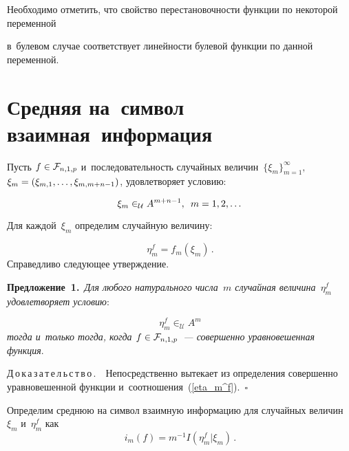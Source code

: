\begin{multicols}{2}
Необходимо отметить, что свойство перестановочности функции по некоторой 
переменной\linebreak\vspace*{-12pt}

\columnbreak

\noindent
 в~булевом случае соответствует линейности булевой функции по данной 
переменной.

\vspace*{-9pt}

\section{Средняя на~символ взаимная~информация}

\vspace*{-2pt}

Пусть $f \hm\in \mathcal{F}_{n,1,p}$ и~последовательность случайных 
величин~$\{\xi_m\}_{m=1}^{\infty},$ $\xi_m\hm=(\xi_{m,1}, \dots, \xi_{m, m+n-1})$, 
удовлетворяет условию:

\noindent
$$
\xi_m \in_{\mathcal{U}} A^{m+n-1},\enskip m = 1,2,\dots
$$

Для каждой~$\xi_m$ определим случайную величину:

\noindent
\begin{equation}
\label{eta_m^f}
\eta _m^f = f_m\left(\xi_m\right)\,.
\end{equation}
Справедливо следующее утверждение.

\smallskip

\noindent
\textbf{Предложение~1.}\
   \textit{Для любого натурального числа~$m$ случайная величина~$\eta_m^f$ 
удовлетворяет условию}:

\noindent
$$
    \eta_m^f \in_{\mathcal{U}} A^m
  $$
    \textit{тогда и~только тогда, когда $f \hm\in \mathcal{F}_{n,1,p}$~--- совершенно 
уравновешенная функция}.

\smallskip

\noindent
Д\,о\,к\,а\,з\,а\,т\,е\,л\,ь\,с\,т\,в\,о\,.\ \
    Непосредственно вытекает из определения совершенно уравновешенной функции 
и~соотношения~(\ref{eta_m^f}).~\hfill$\square$

\smallskip

Определим среднюю на символ взаимную информацию для случайных величин~$\xi_m$ 
и~$\eta_m^f$ как
\begin{equation*}
i_m(f) = m^{-1} I\left(\eta_m^f|\xi_m\right)\,.
\end{equation*}

\vspace*{-2pt}


\end{multicols}

